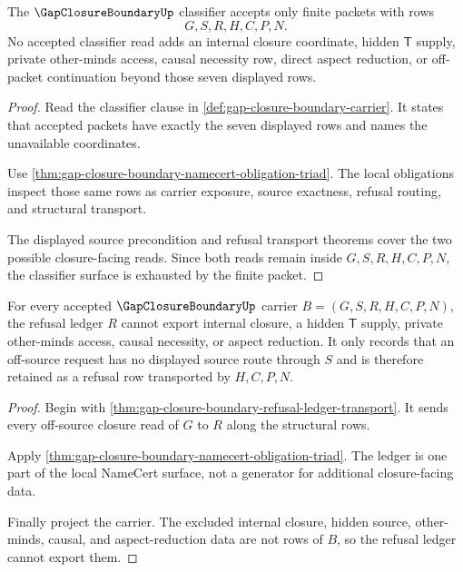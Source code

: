 \begin{theorem}
\label{thm:gap-closure-boundary-classifier-exhaustion}
The $\GapClosureBoundaryUp$ classifier accepts only finite packets with rows
$$
G,S,R,H,C,P,N.
$$
No accepted classifier read adds an internal closure coordinate, hidden $\mathsf{T}$ supply, private other-minds access, causal necessity row, direct aspect reduction, or off-packet continuation beyond those seven displayed rows.
\end{theorem}
\begin{proof}
Read the classifier clause in \autoref{def:gap-closure-boundary-carrier}. It states that accepted packets have exactly the seven displayed rows and names the unavailable coordinates.

Use \autoref{thm:gap-closure-boundary-namecert-obligation-triad}. The local obligations inspect those same rows as carrier exposure, source exactness, refusal routing, and structural transport.

The displayed source precondition and refusal transport theorems cover the two possible closure-facing reads. Since both reads remain inside $G,S,R,H,C,P,N$, the classifier surface is exhausted by the finite packet.
\end{proof}

\begin{theorem}
\label{thm:gap-closure-boundary-ledger-nonescape}
For every accepted $\GapClosureBoundaryUp$ carrier $B=(G,S,R,H,C,P,N)$, the refusal ledger $R$ cannot export internal closure, a hidden $\mathsf{T}$ supply, private other-minds access, causal necessity, or aspect reduction. It only records that an off-source request has no displayed source route through $S$ and is therefore retained as a refusal row transported by $H,C,P,N$.
\end{theorem}
\begin{proof}
Begin with \autoref{thm:gap-closure-boundary-refusal-ledger-transport}. It sends every off-source closure read of $G$ to $R$ along the structural rows.

Apply \autoref{thm:gap-closure-boundary-namecert-obligation-triad}. The ledger is one part of the local NameCert surface, not a generator for additional closure-facing data.

Finally project the carrier. The excluded internal closure, hidden source, other-minds, causal, and aspect-reduction data are not rows of $B$, so the refusal ledger cannot export them.
\end{proof}

